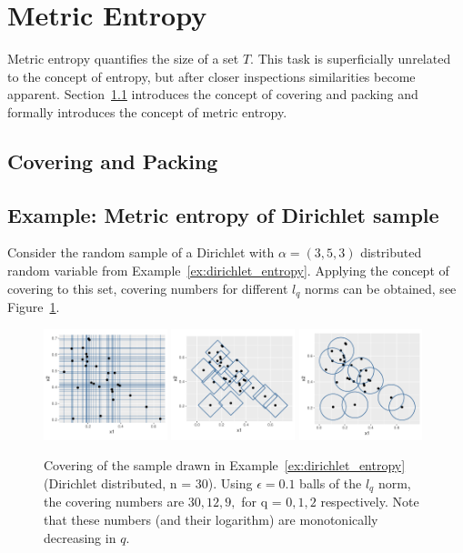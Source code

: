 \documentclass[12pt, twoside]{article}
\newcommand{\1}{\mathbb{1}}
\begin{document}
\section{Metric Entropy}
Metric entropy quantifies the size of a set $T$. This task is superficially unrelated to the concept of entropy, but after closer inspections similarities become apparent.
Section~\ref{covering_packing} introduces the concept of covering and packing and formally introduces the concept of metric entropy.

\subsection{Covering and Packing}\label{covering_packing}


\subsection{Example: Metric entropy of Dirichlet sample}
Consider the random sample of a Dirichlet with $\alpha = (3, 5, 3)$ distributed random variable from Example~\ref{ex:dirichlet_entropy}. Applying the concept of covering to this set, covering numbers for different $l_q$ norms can be obtained, see Figure~\ref{fig:dir_met_ent}.

\begin{figure}[ht]
    \centering
    \includegraphics[width=0.32\textwidth]{plots/l0_covering.pdf}
    \includegraphics[width=0.32\textwidth]{plots/l1_covering.pdf}
    \includegraphics[width=0.32\textwidth]{plots/l2_covering.pdf}
    \caption{Covering of the sample drawn in Example~\ref{ex:dirichlet_entropy} (Dirichlet distributed, n = 30). Using $\epsilon = 0.1$ balls of the $l_q$ norm, the covering numbers are $30, 12, 9,$ for q = $0, 1, 2$ respectively. Note that these numbers (and their logarithm) are monotonically decreasing in $q$.}
    \label{fig:dir_met_ent}
\end{figure}



\clearpage
 
{}
\nocite{maierhoferCoFD}

\end{document}
